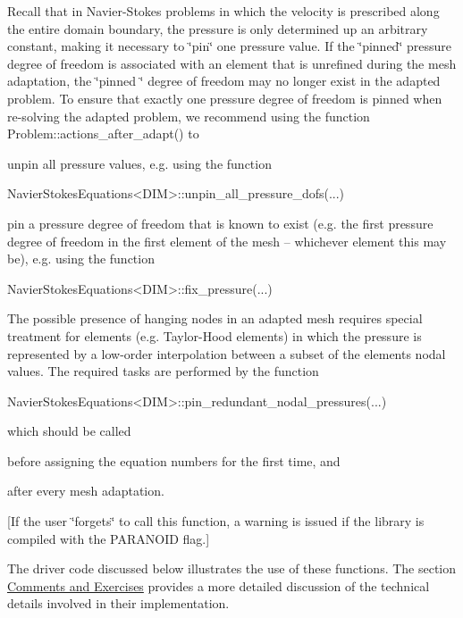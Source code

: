 \begin{DoxyItemize}
\item Recall that in Navier-\/\+Stokes problems in which the velocity is prescribed along the entire domain boundary, the pressure is only determined up an arbitrary constant, making it necessary to \char`\"{}pin\char`\"{} one pressure value. If the \char`\"{}pinned\char`\"{} pressure degree of freedom is associated with an element that is unrefined during the mesh adaptation, the \char`\"{}pinned \char`\"{} degree of freedom may no longer exist in the adapted problem. To ensure that exactly one pressure degree of freedom is pinned when re-\/solving the adapted problem, we recommend using the function {\ttfamily Problem\+::actions\+\_\+after\+\_\+adapt()} to
\begin{DoxyEnumerate}
\item unpin all pressure values, e.\+g. using the function 
\begin{DoxyCode}
NavierStokesEquations<DIM>::unpin\_all\_pressure\_dofs(...)
\end{DoxyCode}

\item pin a pressure degree of freedom that is known to exist (e.\+g. the first pressure degree of freedom in the first element of the mesh -- whichever element this may be), e.\+g. using the function 
\begin{DoxyCode}
NavierStokesEquations<DIM>::fix\_pressure(...)
\end{DoxyCode}

\end{DoxyEnumerate}
\item The possible presence of hanging nodes in an adapted mesh requires special treatment for elements (e.\+g. Taylor-\/\+Hood elements) in which the pressure is represented by a low-\/order interpolation between a subset of the element\textquotesingle{}s nodal values. The required tasks are performed by the function 
\begin{DoxyCode}
NavierStokesEquations<DIM>::pin\_redundant\_nodal\_pressures(...)
\end{DoxyCode}
 which should be called
\begin{DoxyEnumerate}
\item before assigning the equation numbers for the first time, and
\item after every mesh adaptation.
\end{DoxyEnumerate}\mbox{[}If the user \char`\"{}forgets\char`\"{} to call this function, a warning is issued if the library is compiled with the P\+A\+R\+A\+N\+O\+ID flag.\mbox{]}
\end{DoxyItemize}The driver code discussed below illustrates the use of these functions. The section \hyperlink{index_comments}{Comments and Exercises} provides a more detailed discussion of the technical details involved in their implementation.



